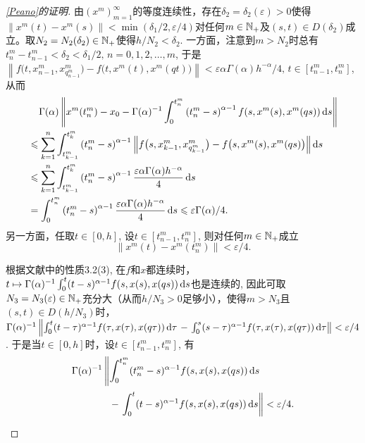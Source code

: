 \begin{proof}[\cref{Peano}的证明]
    由$\left(x^m\right)_{m=1}^\infty$的等度连续性，存在$\delta_2=\delta_2(\varepsilon)>0$使得$\left\|x^m(t)-x^m(s)\right\|<\min \left(\delta_1/2,\allowbreak\varepsilon/4\right)$对任何$m\in \mathbb{N_+}$及$(s,t)\in D\left(\delta_2\right)$成立。取$N_2=N_2(\delta_2)\in \mathbb{N_+}$使得$h/N_2<\delta_2$. 一方面，注意到$m>N_2$时总有$t^m_n-t^m_{n-1}<\delta_2<\delta_1/2,\,n=0,1,2,\dots,m$, 于是$\left\|f\bigl(t,x^m_{n-1},x^m_{q^m_{n-1}}\bigr)-f\bigl(t,x^m(t),x^m(qt)\bigr)\right\|<\varepsilon \alpha \Gamma(\alpha) h^{-\alpha} / 4,\,t\in\left[t^m_{n-1},t^m_n\right]$, 从而
    \begin{equation}\label{tn}
        \begin{aligned}
            &\relphantom{\leqslant}\Gamma(\alpha)\left\|x^m(t^m_n)-x_0-\Gamma(\alpha)^{-1}\int_{0}^{t^m_n}\left(t^m_n-s\right)^{\alpha-1}f(s,x^m(s),x^m(qs))\differential s\right\|
            \\ &\leqslant \sum_{k=1}^{n}\int_{t^m_{k-1}}^{t^m_k}\left(t^m_n-s\right)^{\alpha-1}\left\|f\bigl(s,x^m_{k-1},x^m_{q^m_{k-1}}\bigr)-f\bigl(s,x^m(s),x^m(qs)\bigr)\right\|\differential s
            \\ &\leqslant \sum_{k=1}^{n}\int_{t^m_{k-1}}^{t^m_k}\left(t^m_n-s\right)^{\alpha-1} \frac{\varepsilon \alpha \Gamma(\alpha) h^{-\alpha}}{4} \differential s
            \\ &=\int_{0}^{t^m_n} \left(t^m_n-s\right)^{\alpha-1} \frac{\varepsilon \alpha \Gamma(\alpha) h^{-\alpha}}{4} \differential s
            \leqslant \varepsilon\Gamma(\alpha)/4.
        \end{aligned}
    \end{equation}
    另一方面，任取$t\in [0,h]$, 设$t\in\left[t^m_{n-1},t^m_n\right]$, 则对任何$m\in \mathbb{N_+}$成立
    \begin{equation}\label{xmtnt}
        \left\|x^m(t)-x^m(t^m_n)\right\|<\varepsilon/4.
    \end{equation}

    根据文献中的性质3.2(3), 在$f$和$x$都连续时，$t\mapsto \Gamma(\alpha)^{-1}\int_{0}^{t}(t-s)^{\alpha-1}f(s,x(s),x(qs))\mathop{}\!\mathrm{d} s$也是连续的, 因此可取$N_3=N_3(\varepsilon)\in \mathbb{N_+}$充分大（从而$h/N_3>0$足够小），使得$m>N_3$且$(s,t)\in D(h/N_3)$时，$\Gamma(\alpha)^{-1}\allowbreak\left\|\int_{0}^{t}(t-\tau)^{\alpha-1}f(\tau,x(\tau),x(q\tau))\mathop{}\!\mathrm{d} \tau\right.\allowbreak-\left.\int_{0}^{s}(s-\tau)^{\alpha-1}f(\tau,x(\tau),x(q\tau))\mathop{}\!\mathrm{d} \tau\right\|\allowbreak <\varepsilon/4$. 于是当$t\in [0,h]$时，设$t\in\left[t^m_{n-1},t^m_n\right]$, 有
    \begin{equation}\label{xtnt}
        \begin{aligned}
            \Gamma(\alpha)^{-1}&\left\|\int_{0}^{t^m_n}(t^m_n-s)^{\alpha-1}f(s,x(s),x(qs))\differential s\right.
            \\&\phantom{\left\|\vphantom{\int_{0}^{t^m_n}}\right.}-\left.\int_{0}^{t}(t-s)^{\alpha-1}f(s,x(s),x(qs))\differential s\right\|<\varepsilon/4.
        \end{aligned}
    \end{equation}
    

\end{proof}
